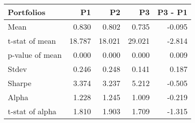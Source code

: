 \begin{tabular}{lrrrr}
\toprule
Portfolios & P1 & P2 & P3 & P3 - P1 \\
\midrule
Mean & 0.830 & 0.802 & 0.735 & -0.095 \\
t-stat of mean & 18.787 & 18.021 & 29.021 & -2.814 \\
p-value of mean & 0.000 & 0.000 & 0.000 & 0.009 \\
Stdev & 0.246 & 0.248 & 0.141 & 0.187 \\
Sharpe & 3.374 & 3.237 & 5.212 & -0.505 \\
Alpha & 1.228 & 1.245 & 1.009 & -0.219 \\
t-stat of alpha & 1.810 & 1.903 & 1.709 & -1.315 \\
\bottomrule
\end{tabular}
